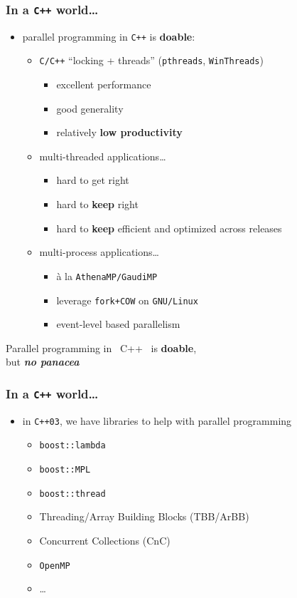 \documentclass[bigger]{beamer}
\providecommand{\alert}[1]{\textbf{#1}}
\begin{document}
\begin{frame}
\frametitle{In a \verb~C++~ world\ldots{}}
\label{sec-1-2}

\begin{itemize}
\item parallel programming in \verb~C++~ is \alert{doable}:
\begin{itemize}
\item \verb~C/C++~ ``locking + threads'' (\verb~pthreads~, \verb~WinThreads~)
\begin{itemize}
\item excellent performance
\item good generality
\item relatively \alert{low productivity}
\end{itemize}
\item multi-threaded applications\ldots{}
\begin{itemize}
\item hard to get right
\item hard to \alert{keep} right
\item hard to \alert{keep} efficient and optimized across releases
\end{itemize}
\item multi-process applications\ldots{}
\begin{itemize}
\item \`a la \verb~AthenaMP/GaudiMP~
\item leverage \verb~fork+COW~ on \verb~GNU/Linux~
\item event-level based parallelism
\end{itemize}
\end{itemize}
\end{itemize}
\begin{block}{\quad}
\label{sec-1-2-1}

 \begin{center}
 Parallel programming in ~C++~ is \alert{doable}, \\
 but \alert{\emph{no panacea}}
 \end{center}
\end{block}
\end{frame}
\begin{frame}
\frametitle{In a \verb~C++~ world\ldots{}}
\label{sec-1-3}

\begin{itemize}
\item in \verb~C++03~, we have libraries to help with parallel programming
\begin{itemize}
\item \verb~boost::lambda~
\item \verb~boost::MPL~
\item \verb~boost::thread~
\item Threading/Array Building Blocks (TBB/ArBB)
\item Concurrent Collections (CnC)
\item \verb~OpenMP~
\item \ldots{}
\end{itemize}
\end{itemize}
\end{frame}
\end{document}

